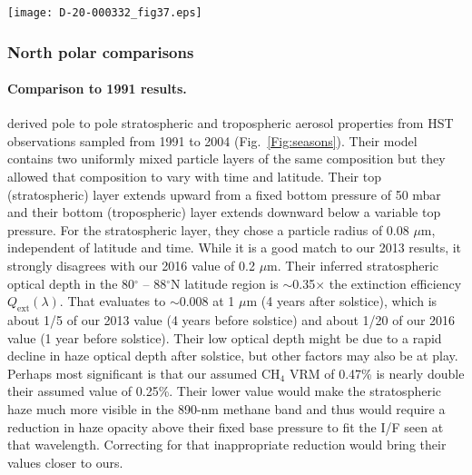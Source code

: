 \documentclass[article,11pt]{emulateapj}
\def\deg{$^\circ$ }
\def\degx{$^\circ$}
\def\mum{$\mu$m }
\def\mumx{$\mu$m}
\def\chf{CH$_4$ }
\def\pthfx{P$_2$H$_4$}
\def\nht{NH$_3$ }
\def\nhfsh{NH$_4$SH }
\begin{document}
\begin{figure*}[!hbt]\centering
\texttt{[image: D-20-000332\_fig37.eps]}
\caption{Schematic representation of models of vertical aerosol structures used to fit
  observations characterized in the legend table above each reference
  column, where observing instrument, temporal
coverage, spatial coverage, assumed methane VMR, approximate stratospheric
and tropospheric particle radii are shown. The instrument label VIMS-IRT refers to
near IR observations including thermal emission near 5 \mumx.
 Note that successful models vary greatly in assumed vertical
  distributions. Reference labels on the x axis  are the same as defined in
the  Fig.\ \ref{Fig:seasons} caption.  Note the multiple compact layers detected
  by limb observations (gray) analyzed by S-L2020.  The tan colors mark
  layers with assumed or derived short wavelength absorption (the
  chromophore layers).  Blue denotes \nht ice
particle layers, pink possible \pthfx, and green possible \nhfsh or H$_2$O
ice particles.}\label{Fig:priormodels}
\end{figure*}

\subsubsection{North polar comparisons}
 
\paragraph{Comparison to 1991 results.}  \cite{Kark2005}
derived pole to pole stratospheric and tropospheric aerosol properties
from HST observations sampled from 1991 to 2004
(Fig.\ \ref{Fig:seasons}). Their model contains two uniformly mixed
particle layers of the same composition but they allowed that
composition to vary with time and latitude.  Their top (stratospheric)
layer extends upward from a fixed bottom pressure of 50 mbar and their
bottom (tropospheric) layer extends downward below a variable top
pressure. For the stratospheric layer, they chose a particle radius of
0.08 \mumx, independent of latitude and time. While it is a good match
to our 2013 results, it strongly disagrees with our 2016 value of 0.2
\mumx. Their inferred stratospheric optical depth in the 80\deg --
88\degx N latitude region is $\sim$0.35$\times$ the extinction
efficiency $Q_\mathrm{ext}(\lambda)$.  That evaluates to $\sim$0.008 at
1 \mum (4 years after solstice), which is about 1/5 of our 2013 value
(4 years before solstice) and about 1/20 of our 2016 value (1 year
before solstice).  Their low optical depth might be due to a rapid
decline in haze optical depth after solstice, but other factors may
also be at play.  Perhaps most significant is that our
assumed \chf VRM of 0.47\%
\citep{Fletcher2009ch4saturn} is nearly double their assumed value of
0.25\%. Their lower
value would make the stratospheric haze
much more visible in the 890-nm methane band and thus would require a
reduction in haze opacity above their fixed base pressure to fit the
I/F seen at that wavelength. Correcting for that inappropriate reduction
would bring their values closer to ours.
\end{document}
